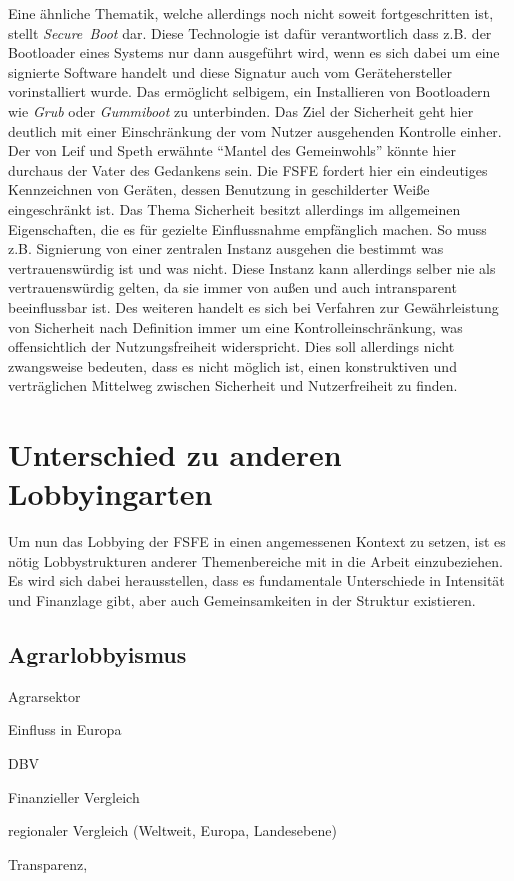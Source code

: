 Eine ähnliche Thematik, welche allerdings noch nicht soweit fortgeschritten 
ist, stellt \emph{Secure~Boot} dar. Diese Technologie ist dafür verantwortlich 
dass z.B. der Bootloader eines Systems nur dann ausgeführt wird, wenn es sich 
dabei um eine signierte Software handelt und diese Signatur auch vom 
Gerätehersteller vorinstalliert wurde. Das ermöglicht selbigem, ein 
Installieren von Bootloadern wie \emph{Grub} oder \emph{Gummiboot} zu 
unterbinden. Das Ziel der Sicherheit geht hier deutlich mit einer Einschränkung 
der vom Nutzer ausgehenden Kontrolle einher. Der von Leif und Speth erwähnte 
``Mantel des Gemeinwohls'' \cite{LeifSpeth200312} könnte hier durchaus der 
Vater des Gedankens sein. Die FSFE fordert hier ein eindeutiges Kennzeichnen 
von Geräten, dessen Benutzung in geschilderter Weiße eingeschränkt ist. 
\cite{FsfeSecureBoot} Das Thema Sicherheit besitzt allerdings im allgemeinen 
Eigenschaften, die es für gezielte Einflussnahme empfänglich machen. So muss 
z.B. Signierung von einer zentralen Instanz ausgehen die bestimmt was 
vertrauenswürdig ist und was nicht. Diese Instanz kann allerdings selber nie 
als vertrauenswürdig gelten, da sie immer von außen und auch intransparent 
beeinflussbar ist. Des weiteren handelt es sich bei Verfahren zur 
Gewährleistung von Sicherheit nach Definition immer um eine 
Kontrolleinschränkung, was offensichtlich der Nutzungsfreiheit widerspricht. 
Dies soll allerdings nicht zwangsweise bedeuten, dass es nicht möglich ist, 
einen konstruktiven und verträglichen Mittelweg zwischen Sicherheit und 
Nutzerfreiheit zu finden.

\section{Unterschied zu anderen Lobbyingarten}
Um nun das Lobbying der FSFE in einen angemessenen Kontext zu setzen, ist es 
nötig Lobbystrukturen anderer Themenbereiche mit in die Arbeit einzubeziehen. 
Es 
wird sich dabei herausstellen, dass es fundamentale Unterschiede in Intensität 
und Finanzlage gibt, aber auch Gemeinsamkeiten in der Struktur existieren.
\subsection{Agrarlobbyismus}
\begin{itemize*}
	\item Agrarsektor \cite{Neimann200312}
	\item Einfluss in Europa \cite{Neimann200312} \cite{ZeitEuroAgrar}
	\item DBV
	\item Finanzieller Vergleich
	\item regionaler Vergleich (Weltweit, Europa, Landesebene)
	\item Transparenz,
\end{itemize*}
